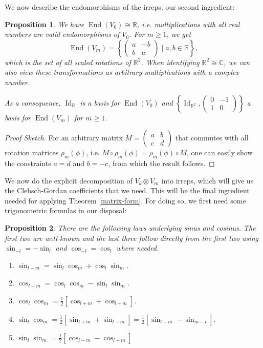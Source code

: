 \documentclass[12pt, a4paper]{article}
\theoremstyle{plain}
\newtheorem{pro}{Proposition}[section]
\theoremstyle{definition}
\theoremstyle{remark}
\newcommand{\R}{\mathds{R}}
\newcommand{\C}{\mathds{C}}
\DeclareMathOperator{\End}{End}
\DeclareMathOperator{\Id}{Id}
\begin{document}
We now describe the endomorphisms of the irreps, our second ingredient:

\begin{pro}\label{endomorphisms}
We have $\End(V_0) \cong \R$, i.e. multiplications with all real numbers are valid endomorphisms of $V_0$. For $m \geq 1$, we get
\begin{equation*}
\End(V_m) = \left\lbrace \begin{pmatrix} a & -b \\ b & a \end{pmatrix} \mid a, b \in \R \right\rbrace,
\end{equation*}
which is the set of all scaled rotations of $\R^2$. When identifying $\R^2 \cong \C$, we can also view these transformations as arbitrary multiplications with a complex number.

As a consequence, $\Id_\R$ is a basis for $\End(V_0)$ and $\left\lbrace\Id_{\R^2}, \begin{pmatrix}0 & -1 \\ 1 & 0 \end{pmatrix}\right\rbrace$ a basis for $\End(V_m)$ for $m \geq 1$.
\end{pro}

\begin{proof}[Proof Sketch]
For an arbitrary matrix $M = \begin{pmatrix} a & b \\ c & d\end{pmatrix}$ that commutes with all rotation matrices $\rho_m(\phi)$, i.e. $M \circ \rho_m(\phi) = \rho_m(\phi) \circ M$, one can easily show the constraints $a = d$ and $b = -c$, from which the result follows. 
\end{proof}

We now do the explicit decomposition of $V_k \otimes V_m$ into irreps, which will give us the Clebsch-Gordan coefficients that we need. This will be the final ingredient needed for applying Theorem \ref{matrix-form}. For doing so, we first need some trigonometric formulas in our disposal:

\begin{pro}\label{trigonometric formulas}
There are the following laws underlying sinus and cosinus. The first two are well-known and the last three follow directly from the first two using $\sin_{-l} = - \sin_l$ and $\cos_{-l} = \cos_l$ where needed.
\begin{enumerate}
\item $\sin_{l+m} = \sin_l \cos_m + \cos_l \sin_m$.
\item $\cos_{l+m} = \cos_l\cos_m - \sin_l \sin_m$.
\item $\cos_l \cos_m = \frac{1}{2} \left[ \cos_{l+m} + \cos_{l-m} \right]$.
\item $\sin_l \cos_m = \frac{1}{2} \left[  \sin_{l+m} + \sin_{l-m} \right] = \frac{1}{2} \left[ \sin_{l+m} - \sin_{m - l}\right]$.
\item $\sin_l \sin_m = \frac{1}{2} \left[ \cos_{l-m} - \cos_{l+m} \right]$
\end{enumerate}
\end{pro}
\end{document}
